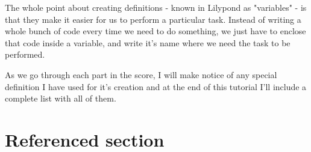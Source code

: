 \documentclass[../../LilyPond-Tutorials]{subfiles}
\begin{document}
The whole point about creating definitions - known in Lilypond as "variables" - is that they make it easier for us to perform a particular task.
Instead of writing a whole bunch of code every time we need to do something, we just have to enclose that code inside a variable, and write it's name where we need the task to be performed.

As we go through each part in the score, I will make notice of any special definition I have used for it's creation and at the end of this tutorial I'll include a complete list with all of them.

\pagebreak

\section{Referenced section}
\label{sec:ref_sec}
\end{document}
